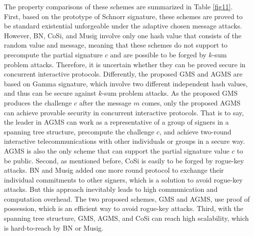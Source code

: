 \documentclass[journal]{IEEEtran}
\begin{document}
The property comparisons of these schemes are summarized in Table \ref{fig11}.
First, based on the prototype of Schnorr signature, these schemes are proved to be standard existential unforgeable under the adaptive chosen message attacks. However, BN, CoSi, and Musig involve only one hash value that consists of the random value and message, meaning that these schemes do not support to precompute the partial signature \(c\) and are possible to be forged by \(k\)-sum problem attacks. Therefore, it is uncertain whether they can be proved secure in concurrent interactive protocols.
Differently, the proposed GMS and AGMS are based on Gamma signature, which involve two different independent hash values, and thus can be secure against \(k\)-sum problem attacks. As the proposed GMS produces the challenge \(c\) after the message \(m\) comes, only the proposed AGMS can achieve provable security in concurrent interactive protocols. That is to say, the leader in AGMS can work as a representative of a group of signers in a spanning tree structure, precompute the challenge \(c\), and achieve two-round interactive telecommunications with other individuals or groups in a secure way. AGMS is also the only scheme that can support the partial signature value \(c\) to be public.
Second, as mentioned before, CoSi is easily to be forged by rogue-key attacks. BN and Musig added one more round protocol to exchange their individual commitments to other signers, which is a solution to avoid rogue-key attacks. But this approach inevitably leads to high communication and computation overhead. The two proposed schemes, GMS and AGMS, use proof of possession, which is an efficient way to avoid rogue-key attacks.
Third, with the spanning tree structure, GMS, AGMS, and CoSi can reach high scalability, which is hard-to-reach by BN or Musig.
\end{document}
